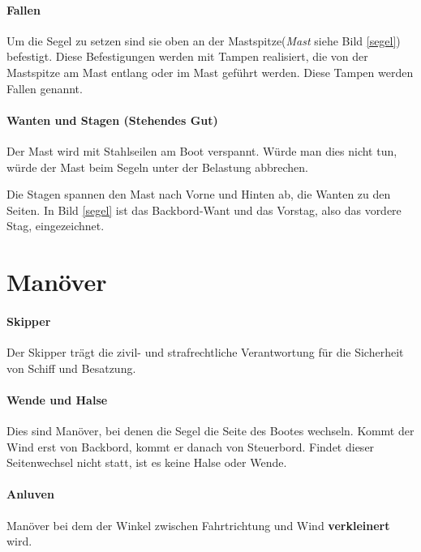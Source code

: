 \documentclass[12pt]{article}
\newcommand{\xbox}[1]{\vspace{1em}\fcolorbox{grey}{white}{\parbox{0.8\textwidth}{\textcolor{grey}{#1}}}}
\begin{document}
\xbox{Je nach Gegebenheiten im Hafen werden andere Leinen ausgelegt. Vor jedem Anlegemanöver werden wir die Reihenfolge und Anzahl der Leinen mit euch besprechen.}

\paragraph{Fallen}
Um die Segel zu setzen sind sie oben an der Mastspitze(\textit{Mast} siehe Bild \ref{segel}) befestigt. Diese Befestigungen werden mit Tampen realisiert, die von der Mastspitze am Mast entlang oder im Mast geführt werden. Diese Tampen werden Fallen genannt.

\paragraph{Wanten und Stagen (Stehendes Gut)}
Der Mast wird mit Stahlseilen am Boot verspannt. Würde man dies nicht tun, würde der Mast beim Segeln unter der Belastung abbrechen.

Die Stagen spannen den Mast nach Vorne und Hinten ab, die Wanten zu den Seiten. In Bild \ref{segel} ist das Backbord-Want und das Vorstag, also das vordere Stag, eingezeichnet.


\section{Manöver}

\paragraph{Skipper}
Der Skipper trägt die zivil- und strafrechtliche Verantwortung für die Sicherheit von Schiff und Besatzung.

\paragraph{Wende und Halse}
Dies sind Manöver, bei denen die Segel die Seite des Bootes wechseln. Kommt der Wind erst von Backbord, kommt er danach von Steuerbord. Findet dieser Seitenwechsel nicht statt, ist es keine Halse oder Wende.

\paragraph{Anluven}
Manöver bei dem der Winkel zwischen Fahrtrichtung und Wind \textbf{verkleinert} wird.
\end{document}
